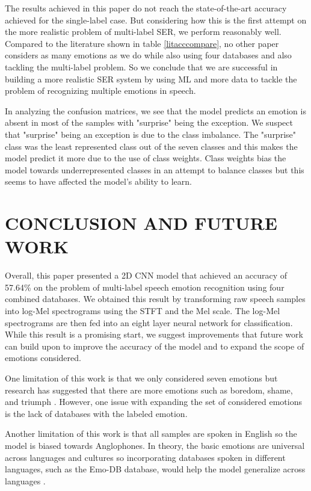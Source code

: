 \documentclass[a4paper, 10pt, conference]{ieeeconf}      %
\begin{document}
The results achieved in this paper do not reach the state-of-the-art accuracy achieved for the single-label case. But considering how this is the first attempt on the more realistic problem of multi-label SER, we perform reasonably well. Compared to the literature shown in table \ref{litacccompare}, no other paper considers as many emotions as we do while also using four databases and also tackling the multi-label problem. So we conclude that we are successful in building a more realistic SER system by using ML and more data to tackle the problem of recognizing multiple emotions in speech.

In analyzing the confusion matrices, we see that the model predicts an emotion is absent in most of the samples with "surprise" being the exception. We suspect that "surprise" being an exception is due to the class imbalance. The "surprise" class was the least represented class out of the seven classes and this makes the model predict it more due to the use of class weights. Class weights bias the model towards underrepresented classes in an attempt to balance classes but this seems to have affected the model's ability to learn.


\section{CONCLUSION AND FUTURE WORK}

Overall, this paper presented a 2D CNN model that achieved an accuracy of 57.64\% on the problem of multi-label speech emotion recognition using four combined databases. We obtained this result by transforming raw speech samples into log-Mel spectrograms using the STFT and the Mel scale. The log-Mel spectrograms are then fed into an eight layer neural network for classification. While this result is a promising start, we suggest improvements that future work can build upon to improve the accuracy of the model and to expand the scope of emotions considered.

One limitation of this work is that we only considered seven emotions but research has suggested that there are more emotions such as boredom, shame, and triumph \cite{Cordaro2018}. However, one issue with expanding the set of considered emotions is the lack of databases with the labeled emotion.

Another limitation of this work is that all samples are spoken in English so the model is biased towards Anglophones. In theory, the basic emotions are universal across languages and cultures so incorporating databases spoken in different languages, such as the Emo-DB database, would help the model generalize across languages \cite{Burkhardt2005}.
\end{document}
